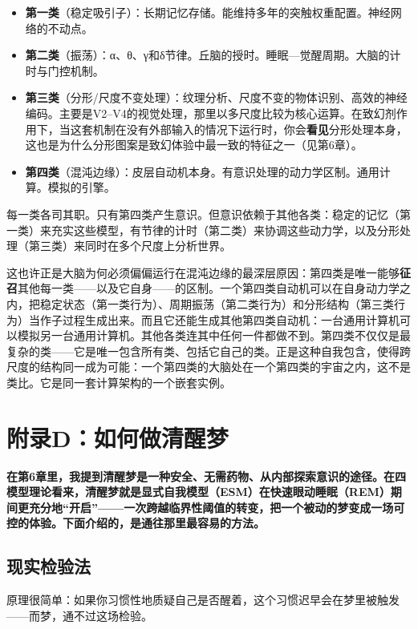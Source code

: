 \documentclass[11pt, twoside, openright]{book}
\begin{document}
\begin{itemize}
  \item \textbf{第一类}（稳定吸引子）：长期记忆存储。能维持多年的突触权重配置。神经网络的不动点。
  \item \textbf{第二类}（振荡）：α、θ、γ和δ节律。丘脑的授时。睡眠---觉醒周期。大脑的计时与门控机制。
  \item \textbf{第三类}（分形/尺度不变处理）：纹理分析、尺度不变的物体识别、高效的神经编码。主要是V2--V4的视觉处理，那里以多尺度比较为核心运算。在致幻剂作用下，当这套机制在没有外部输入的情况下运行时，你会\textbf{看见}分形处理本身，这也是为什么分形图案是致幻体验中最一致的特征之一（见第6章）。
  \item \textbf{第四类}（混沌边缘）：皮层自动机本身。有意识处理的动力学区制。通用计算。模拟的引擎。
\end{itemize}

每一类各司其职。只有第四类产生意识。但意识依赖于其他各类：稳定的记忆（第一类）来充实这些模型，有节律的计时（第二类）来协调这些动力学，以及分形处理（第三类）来同时在多个尺度上分析世界。

这也许正是大脑为何必须偏偏运行在混沌边缘的最深层原因：第四类是唯一能够\textbf{征召}其他每一类------以及它自身------的区制。一个第四类自动机可以在自身动力学之内，把稳定状态（第一类行为）、周期振荡（第二类行为）和分形结构（第三类行为）当作子过程生成出来。而且它还能生成其他第四类自动机：一台通用计算机可以模拟另一台通用计算机。其他各类连其中任何一件都做不到。第四类不仅仅是最复杂的类------它是唯一包含所有类、包括它自己的类。正是这种自我包含，使得跨尺度的结构同一成为可能：一个第四类的大脑处在一个第四类的宇宙之内，这不是类比。它是同一套计算架构的一个嵌套实例。


\chapter*{附录D：如何做清醒梦}

\textbf{在第6章里，我提到清醒梦是一种安全、无需药物、从内部探索意识的途径。在四模型理论看来，清醒梦就是显式自我模型（ESM）在快速眼动睡眠（REM）期间更充分地“开启”------一次跨越临界性阈值的转变，把一个被动的梦变成一场可控的体验。下面介绍的，是通往那里最容易的方法。}

\section*{现实检验法}

原理很简单：如果你习惯性地质疑自己是否醒着，这个习惯迟早会在梦里被触发------而梦，通不过这场检验。
\end{document}
